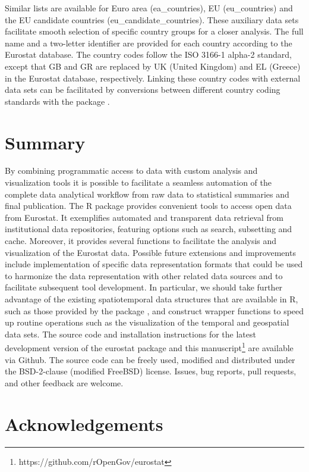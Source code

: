 Similar lists are available for Euro area (ea\_countries), EU
(eu\_countries) and the EU candidate countries
(eu\_candidate\_countries). These auxiliary data sets facilitate
smooth selection of specific country groups for a closer analysis. The
full name and a two-letter identifier are provided for each country
according to the Eurostat database. The country codes follow the ISO
3166-1 alpha-2 standard, except that GB and GR are replaced by UK
(United Kingdom) and EL (Greece) in the Eurostat database,
respectively. Linking these country codes with external data sets can
be facilitated by conversions between different country coding
standards with the  package \citep{countrycode}.




\section{Summary}


By combining programmatic access to data with custom analysis and
visualization tools it is possible to facilitate a seamless automation
of the complete data analytical workflow from raw data to statistical
summaries and final publication. The  R package
provides convenient tools to access open data from Eurostat. It
exemplifies automated and transparent data retrieval from
institutional data repositories, featuring options such as search,
subsetting and cache. Moreover, it provides several functions to
facilitate the analysis and visualization of the Eurostat
data. Possible future extensions and improvements include
implementation of specific data representation formats that could be
used to harmonize the data representation with other related data
sources and to facilitate subsequent tool development. In particular,
we should take further advantage of the existing spatiotemporal data
structures that are available in R, such as those provided by
the  package \citep{spacetime}, and construct
wrapper functions to speed up routine operations such as the
visualization of the temporal and geospatial data sets. The source
code and installation instructions for the latest development version
of the eurostat package and this
manuscript\footnote{https://github.com/rOpenGov/eurostat} are
available via Github. The source code can be freely used, modified and
distributed under the BSD-2-clause (modified FreeBSD) license. Issues,
bug reports, pull requests, and other feedback are welcome.


\section*{Acknowledgements}

